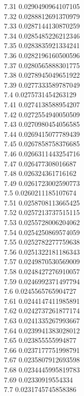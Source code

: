 {7.31	0.0290490964107105\\
7.32	0.0288812691370979\\
7.33	0.0287144130870259\\
7.34	0.0285485226212346\\
7.35	0.0283835921334241\\
7.36	0.0282196160500596\\
7.37	0.0280565888301775\\
7.38	0.0278945049651922\\
7.39	0.0277333589787049\\
7.4	0.0275731454263129\\
7.41	0.0274138588954207\\
7.42	0.0272554940050509\\
7.43	0.0270980454056585\\
7.44	0.0269415077789439\\
7.45	0.0267858758376685\\
7.46	0.0266311443254716\\
7.47	0.026477308016687\\
7.48	0.026324361716162\\
7.49	0.0261723002590773\\
7.5	0.0260211185107674\\
7.51	0.0258708113665425\\
7.52	0.0257213737515115\\
7.53	0.0255728006204062\\
7.54	0.0254250869574059\\
7.55	0.0252782277759638\\
7.56	0.0251322181186343\\
7.57	0.0249870530569009\\
7.58	0.0248427276910057\\
7.59	0.0246992371497794\\
7.6	0.0245565765904727\\
7.61	0.0244147411985891\\
7.62	0.0242737261877174\\
7.63	0.0241335267993667\\
7.64	0.0239941383028012\\
7.65	0.023855555994877\\
7.66	0.0237177751998791\\
7.67	0.0235807912693598\\
7.68	0.0234445995819783\\
7.69	0.02330919554334\\
7.7	0.0231745745858386\\
}
